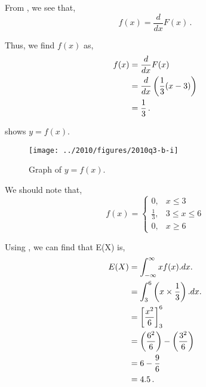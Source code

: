 \begin{subquestions}
\subquestion

\begin{subsubquestions}
	
\subsubquestion

From , we see that,
\begin{equation}
	f(x) = \frac{d}{dx}F(x) \,.
\end{equation}
	
Thus, we find $f(x)$ as,
\begin{align}
	f(x) & = \frac{d}{dx}F(x) \nonumber \\
	     & = \frac{d}{dx}\left(\frac{1}{3}(x-3) \right) \nonumber \\
	     & = \frac{1}{3} \,.
\end{align}

 shows $y=f(x)$.
\begin{figure}[H]
	\begin{center}
		\texttt{[image: ../2010/figures/2010q3-b-i]}
		\caption{\label{2010:q3:fig:fGraph} Graph of $y=f(x)$.}
	\end{center}
\end{figure}

We should note that,
\[ f(x) =\begin{cases} 
	0, & x \leq 3 \\
	\frac{1}{3}, & 3 \leq x \leq 6 \\
	0, & x \geq 6 
		\end{cases}
\]


\subsubquestion

Using , we can find that E(X) is,
\begin{align}
	E(X) & = \int_{-\infty}^{\infty}x f(x).dx. \nonumber \\
	     & = \int_{3}^{6} \left(x \times \frac{1}{3} \right).dx. \nonumber \\
	     & = \left[\frac{x^2}{6} \right]^{6}_{3} \nonumber \\
	     & = \left( \frac{6^2}{6} \right) - \left( \frac{3^2}{6} \right) \nonumber \\
	     & = 6 - \frac{9}{6} \nonumber \\
	     & = 4.5 \,.
\end{align}


\subsubquestion


\end{subsubquestions}
\end{subquestions}
